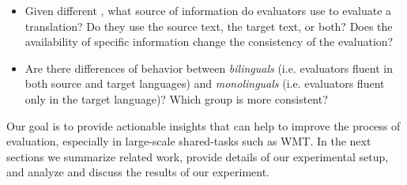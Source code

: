 \begin{itemize}
\item Given different \gamets, what source of information do evaluators use to evaluate a translation? Do they use the source text, the target text, or both? Does the availability of specific information change the consistency of the evaluation?


\item Are there differences of behavior between \emph{bilinguals} (i.e. evaluators fluent in both source and target languages) and \emph{monolinguals} (i.e. evaluators fluent only in the target language)?
Which group is more consistent?


\end{itemize}

Our goal is to provide actionable insights that can help to improve the process of evaluation, especially in large-scale shared-tasks such as WMT. In the next sections we summarize related work, provide details of our experimental setup, and analyze and discuss the results of our experiment. 

